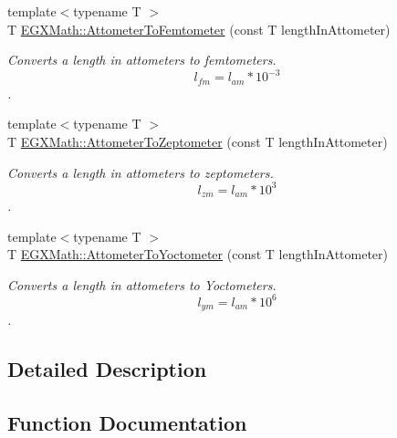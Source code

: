 \begin{DoxyCompactItemize}
{\footnotesize template$<$typename T $>$ }\\T \mbox{\hyperlink{group___e_g_x_math-_conversions-_length_conversions-_attometer-_s_i_gafbaa622bc31794c382e244942fa1d445}{E\+G\+X\+Math\+::\+Attometer\+To\+Femtometer}} (const T length\+In\+Attometer)
\begin{DoxyCompactList}\small\item\em Converts a length in attometers to femtometers. \[ l_{fm}=l_{am} * 10^{-3} \]. \end{DoxyCompactList}\item 
{\footnotesize template$<$typename T $>$ }\\T \mbox{\hyperlink{group___e_g_x_math-_conversions-_length_conversions-_attometer-_s_i_ga88493321ed49951744e5afe2b0bf7e5c}{E\+G\+X\+Math\+::\+Attometer\+To\+Zeptometer}} (const T length\+In\+Attometer)
\begin{DoxyCompactList}\small\item\em Converts a length in attometers to zeptometers. \[ l_{zm}=l_{am} * 10^{3} \]. \end{DoxyCompactList}\item 
{\footnotesize template$<$typename T $>$ }\\T \mbox{\hyperlink{group___e_g_x_math-_conversions-_length_conversions-_attometer-_s_i_gaf325d426b8544c973b0f140b0d4e0f06}{E\+G\+X\+Math\+::\+Attometer\+To\+Yoctometer}} (const T length\+In\+Attometer)
\begin{DoxyCompactList}\small\item\em Converts a length in attometers to Yoctometers. \[ l_{ym}=l_{am} * 10^{6} \]. \end{DoxyCompactList}\end{DoxyCompactItemize}


\subsection{Detailed Description}


\subsection{Function Documentation}
\mbox{\label{group___e_g_x_math-_conversions-_length_conversions-_attometer-_s_i_gaff6439c15e3bb4a90595864e814960a7}} 
